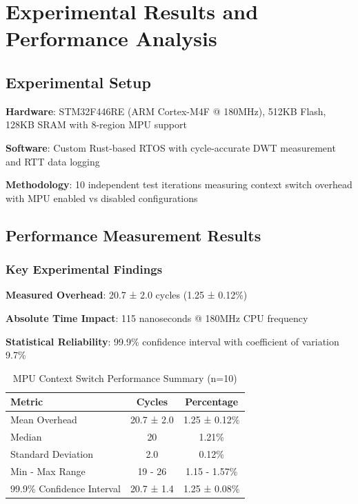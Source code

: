 \chapter{Experimental Results and Performance Analysis}
\label{sec:experimental-results}

\section{Experimental Setup}

\textbf{Hardware}: STM32F446RE (ARM Cortex-M4F @ 180MHz), 512KB Flash, 128KB SRAM with 8-region MPU support

\textbf{Software}: Custom Rust-based RTOS with cycle-accurate DWT measurement and RTT data logging

\textbf{Methodology}: 10 independent test iterations measuring context switch overhead with MPU enabled vs disabled configurations

\section{Performance Measurement Results}

\subsection{Key Experimental Findings}

\textbf{Measured Overhead}: 20.7 ± 2.0 cycles (1.25 ± 0.12\%)

\textbf{Absolute Time Impact}: 115 nanoseconds @ 180MHz CPU frequency

\textbf{Statistical Reliability}: 99.9\% confidence interval with coefficient of variation 9.7\%

\begin{table}[h]
\centering
\caption{MPU Context Switch Performance Summary (n=10)}
\label{tab:benchmark-summary}
\begin{tabular}{@{}lcc@{}}
\toprule
Metric & Cycles & Percentage \\
\midrule
Mean Overhead & 20.7 ± 2.0 & 1.25 ± 0.12\% \\
Median & 20 & 1.21\% \\
Standard Deviation & 2.0 & 0.12\% \\
Min - Max Range & 19 - 26 & 1.15 - 1.57\% \\
99.9\% Confidence Interval & 20.7 ± 1.4 & 1.25 ± 0.08\% \\
\bottomrule
\end{tabular}
\end{table}

